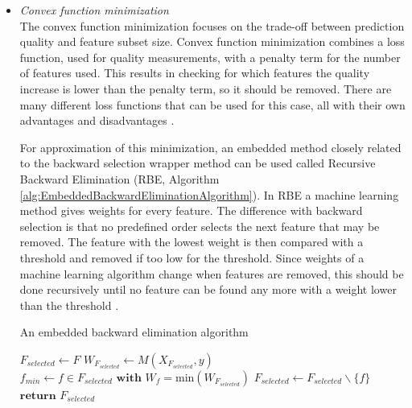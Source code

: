 \documentclass[10pt,a4paper]{report}
\begin{document}
\begin{itemize}
		\item \textit{Convex function minimization} \\
		
		The convex function minimization focuses on the trade-off between prediction quality and feature subset size. Convex function minimization combines a loss function, used for quality measurements, with a penalty term for the number of features used. This results in checking for which features the quality increase is lower than the penalty term, so it should be removed. There are many different loss functions that can be used for this case, all with their own advantages and disadvantages \cite{Lal2006}.
		
		For approximation of this minimization, an embedded method closely related to the backward selection wrapper method can be used called Recursive Backward Elimination (RBE, Algorithm \ref{alg:EmbeddedBackwardEliminationAlgorithm}). In RBE a machine learning method gives weights for every feature. The difference with backward selection is that no predefined order selects the next feature that may be removed. The feature with the lowest weight is then compared with a threshold and removed if too low for the threshold. Since weights of a machine learning algorithm change when features are removed, this should be done recursively until no feature can be found any more with a weight lower than the threshold \cite{Lal2006}.
		
		\begin{algorithm}[H]
			\caption{An embedded backward elimination algorithm \cite{Lal2006} }\label{alg:EmbeddedBackwardEliminationAlgorithm}
			\begin{algorithmic}[1]
				\State $F_{\textit{selected}} \gets F$ 	
				 
				\State $W_{F_{\textit{selected}}} \gets M(X_{F_{\textit{selected}}}, y)$
				\State $f_{\textit{min}} \gets f \in F_{\textit{selected}} \textbf{ with } W_f = \text{min}(W_{F_{\textit{selected}}})$ 
					
				\State $F_{\textit{selected}} \gets F_{\textit{selected}} \backslash \{f\}$ 					
				\EndIf
				\EndWhile
				\State $\textbf{return } F_{\textit{selected}}$
				\EndProcedure
			\end{algorithmic}
		\end{algorithm}
		
	\end{itemize}
	
\end{document}
